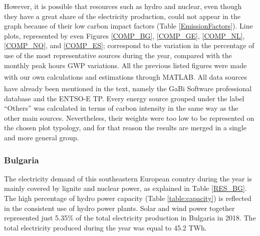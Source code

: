 {However, it is possible that resources such as hydro and nuclear, even though they have a great share of the electricity production,  could not appear in the graph because of their low carbon impact factors (Table \ref{EmissionFactors}). Line plots, represented by even Figures \ref{COMP_BG}, \ref{COMP_GE}, \ref{COMP_NL}, \ref{COMP_NO}, and \ref{COMP_ES}; correspond to the variation in the percentage of use of the most representative sources during the year, compared with the monthly peak hours GWP variations. {All the previous listed figures were made with our own calculations and estimations through MATLAB\textsuperscript{\textregistered}. All data sources have already been mentioned in the text, namely the  GaBi\textsuperscript{\textregistered} Software professional database and the ENTSO-E TP.} {Every energy source grouped under the label ``Others'' was calculated in terms of carbon intensity in the same way as the other main sources. Nevertheless, their weights were too low to be represented on the chosen plot typology, and for that reason the results are merged in a single and more general group}.\\





\subsubsection{Bulgaria}
The electricity demand of this southeastern European country  during the year is mainly covered by lignite and nuclear power, as explained in Table \ref{RES_BG}. The high percentage of hydro power capacity (Table \ref{table:capacity}) is reflected in the  consistent use of hydro power plants. Solar and wind power together represented  just 5.35\% of the total electricity production in Bulgaria in 2018. The total electricity produced during the year was equal to 45.2 TWh. 
 
 
 \begin{table}[htbp]
\centering
\caption{Percentage of resources used during peak and off-peak hours in Bulgaria  \cite{Entso-eProduction}.}
\label{RES_BG}
\end{table}
 
}
